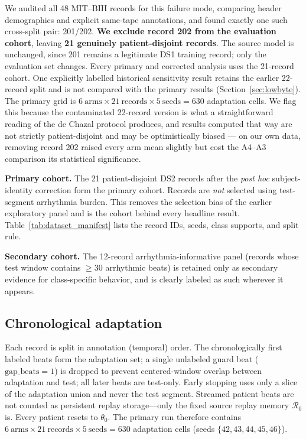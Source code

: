 We audited all 48 MIT--BIH records for this failure mode, comparing header
demographics and explicit same-tape annotations, and found exactly one such
cross-split pair: 201/202. \textbf{We exclude record 202 from the evaluation
cohort}, leaving \textbf{21 genuinely patient-disjoint records}. The source model
is unchanged, since 201 remains a legitimate DS1 training record; only the
evaluation set changes. Every primary and corrected analysis uses the 21-record
cohort. One explicitly labelled historical sensitivity result retains the earlier
22-record split and is not compared with the primary results
(Section~\ref{sec:lowbyte}). The primary grid is
$6\ \text{arms}\times21\ \text{records}\times5\ \text{seeds}=630$ adaptation
cells. We flag this because the contaminated 22-record version is what a
straightforward reading of the de Chazal protocol produces, and results computed
that way are not strictly patient-disjoint and may be optimistically biased ---
on our own data, removing record 202
raised every arm mean slightly but cost the A4--A3 comparison its statistical
significance.

\textbf{Primary cohort.} The 21 patient-disjoint DS2 records after the
\emph{post hoc} subject-identity correction form the primary cohort. Records are \emph{not}
selected using test-segment arrhythmia burden. This removes the selection bias of
the earlier exploratory panel and is the cohort behind every headline result.
Table~\ref{tab:dataset_manifest} lists the record IDs, seeds, class supports, and
split rule.

\textbf{Secondary cohort.} The 12-record arrhythmia-informative panel (records
whose test window contains $\ge 30$ arrhythmic beats) is retained only as
secondary evidence for class-specific behavior, and is clearly labeled as such
wherever it appears.



\subsection{Chronological adaptation}

Each record is split in annotation (temporal) order. The chronologically first
labeled beats form the adaptation set; a single unlabeled guard beat
($\mathrm{gap\_beats}=1$) is dropped to prevent centered-window overlap between
adaptation and test; all later beats are test-only. Early stopping uses only a
slice of the adaptation union and never the test segment. Streamed patient beats
are not counted as persistent replay storage---only the fixed source replay
memory $\mathcal{R}_0$ is. Every patient resets to $\theta_0$. The primary
run therefore contains $6\ \text{arms}\times21\ \text{records}\times5\
\text{seeds}=630$ adaptation cells (seeds $\{42,43,44,45,46\}$).

